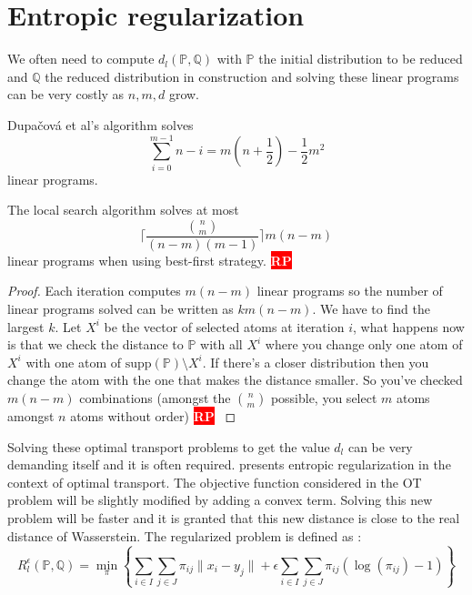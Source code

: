 \documentclass{amsart}
\newcommand{\nb}[3]{
		{\colorbox{#2}{\bfseries\sffamily\tiny\textcolor{white}{#1}}}
		{\textcolor{#2}{\text{$\blacktriangleright$}{\textcolor{#2}{#3}}\text{$\blacktriangleleft$}}}}
\newcommand{\rp}[1]{\nb{RP}{red}{#1}}
\begin{document}
\section{Entropic regularization}
We often need to compute $d_l\left(\mathbb{P},\mathbb{Q}\right)$ with $\mathbb{P}$ the initial distribution to be reduced and $\mathbb{Q}$ the reduced distribution in construction and solving these linear programs can be very costly as $n,m,d$ grow. 
\begin{corollary}
    Dupačová et al's algorithm solves $$\sum_{i=0}^{m-1}n-i=m(n+\frac{1}{2})-\frac{1}{2}m^2$$ linear programs. 
\end{corollary}
\begin{corollary}
    The local search algorithm solves at most $$\lceil \frac{\binom{n}{m}}{\left(n-m\right)\left(m-1\right)}\rceil m\left(n-m\right)$$ linear programs when using best-first strategy.  \rp{the factor in front is in fact not true, need to think more}
\end{corollary}
\begin{proof}
    Each iteration computes $m\left(n-m\right)$ linear programs so the number of linear programs solved can be written as $km\left(n-m\right)$. We have to find the largest $k$. Let $X^i$ be the vector of selected atoms at iteration $i$, what happens now is that we check the distance to $\mathbb{P}$ with all $X^i$ where you change only one atom of $X^i$ with one atom of $\text{supp}\left(\mathbb{P}\right)\setminus X^i$. If there's a closer distribution then you change the atom with the one that makes the distance smaller. So you've checked $m\left(n-m\right)$ combinations (amongst the $\binom{n}{m}$ possible, you select $m$ atoms amongst $n$ atoms without order)\rp{the factor in front is in fact not true, need to think more}
\end{proof}
Solving these optimal transport problems to get the value $d_l$ can be very demanding itself and it is often required. \cite[Chapter 4]{peyre_computational_2019} presents entropic regularization in the context of optimal transport. The objective function considered in the OT problem will be slightly modified by adding a convex term. Solving this new problem will be faster and it is granted that this new distance is close to the real distance of Wasserstein. 
The regularized problem is defined as : 
$$
R_l^\epsilon\left(\mathbb{P},\mathbb{Q}\right)=\min_{\pi}\left\{\sum_{i\in I}\sum_{j\in J}\pi_{ij}\lVert x_i-y_j\rVert+\epsilon\sum_{i\in I}\sum_{j\in J}\pi_{ij}\left(\log{\left(\pi_{ij}\right)}-1\right)\right\}
$$
\clearpage
\appendix
\end{document}
